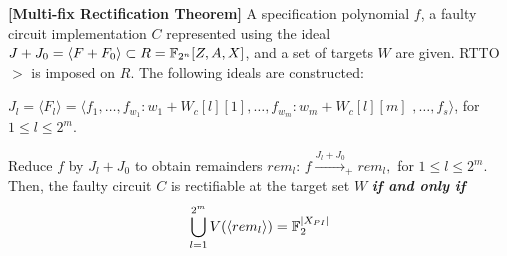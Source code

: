 \begin{Theorem}{\bf [Multi-fix Rectification Theorem]}\label{Thm:rect}
A specification polynomial $f$, a faulty circuit
implementation $C$ represented using the ideal 
$J +J_0 = \langle F + F_0\rangle \subset R = {\mathbb{F}}_{2^n}[Z,A,X]$,
 and a set of targets $W$ are given. 
RTTO $>$ is imposed on $R$. 
The following ideals are constructed:  
\bi
\item $J_l = \langle F_l\rangle =\langle f_1,\dots,f_{w_1}:w_1+W_c[l][1],
	\dots,f_{w_m}:w_m+W_c[l][m]$ $,\dots,f_s\rangle$, for $1 \leq l \leq 2^m$. 
\ei

Reduce $f$ by $J_l + J_0$ to obtain remainders $rem_l$: 
$f\xrightarrow{J_l +  J_{0}}_+ rem_l,$  for $1 \leq l \leq 2^m$.
Then, the faulty circuit $C$ is rectifiable at the target set $W$ {\bf\textit{if
   and only if}} 
\begin{equation}
   \bigcup\limits_{l=1}^{2^m}V(\langle rem_l \rangle) = {\mathbb{F}}_{2}^{|X_{PI}|}  
   \label{eq:rcheck}
\end{equation}

\end{Theorem}

